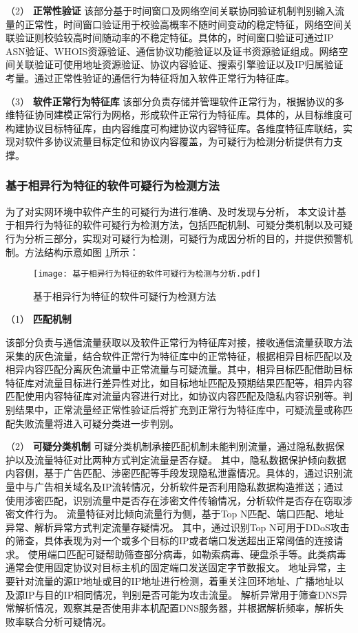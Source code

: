（2） \textbf{正常性验证}\quad
该部分基于时间窗口及网络空间关联协同验证机制判别输入流量的正常性，时间窗口验证用于校验高概率不随时间变动的稳定特征，网络空间关联验证则校验较高时间随动率的不稳定特征。具体的，时间窗口验证可通过IP ASN验证、WHOIS资源验证、通信协议功能验证以及证书资源验证组成。网络空间关联验证可使用地址资源验证、协议内容验证、搜索引擎验证以及IP归属验证考量。通过正常性验证的通信行为特征将加入软件正常行为特征库。

（3） \textbf{软件正常行为特征库}\quad
该部分负责存储并管理软件正常行为，根据协议的多维特征协同建模正常行为网格，形成软件正常行为特征库。具体的，从目标维度可构建协议目标特征库，由内容维度可构建协议内容特征库。各维度特征库联结，实现对软件多协议流量目标定位和协议内容覆盖，为可疑行为检测分析提供有力支撑。 
\FloatBarrier
\subsubsection{基于相异行为特征的软件可疑行为检测方法}
\FloatBarrier

为了对实网环境中软件产生的可疑行为进行准确、及时发现与分析，
本文设计基于相异行为特征的软件可疑行为检测方法，包括匹配机制、可疑分类机制以及可疑行为分析三部分，实现对可疑行为检测，可疑行为成因分析的目的，并提供预警机制。方法结构示意如图 \ref{fig:基于相异行为特征的软件可疑行为检测方法}所示：

 
\begin{figure}[ht]
  \centering
  \texttt{[image: 基于相异行为特征的软件可疑行为检测与分析.pdf]}
  \caption{基于相异行为特征的软件可疑行为检测方法}
  \label{fig:基于相异行为特征的软件可疑行为检测方法}
\end{figure} 


（1） \textbf{匹配机制}\quad

该部分负责与通信流量获取以及软件正常行为特征库对接，接收通信流量获取方法采集的灰色流量，结合软件正常行为特征库中的正常特征，根据相异目标匹配以及相异内容匹配分离灰色流量中正常流量与可疑流量。其中，相异目标匹配借助目标特征库对流量目标进行差异性对比，如目标地址匹配及预期结果匹配等，相异内容匹配使用内容特征库对流量内容进行对比，如协议内容匹配及隐私内容识别等。判别结果中，正常流量经正常性验证后将扩充到正常行为特征库中，可疑流量或称匹配失败流量将进入可疑分类进一步判别。

（2） \textbf{可疑分类机制}\quad
可疑分类机制承接匹配机制未能判别流量，通过隐私数据保护以及流量特征对比两种方式判定流量是否存疑。
其中，隐私数据保护倾向数据内容侧，基于广告匹配、涉密匹配等手段发现隐私泄露情况。具体的，通过识别流量中与广告相关域名及IP流转情况，分析软件是否利用隐私数据构造推送；通过使用涉密匹配，识别流量中是否存在涉密文件传输情况，分析软件是否存在窃取涉密文件行为。
流量特征对比倾向流量行为侧，基于Top N匹配、端口匹配、地址异常、解析异常方式判定流量存疑情况。
其中，通过识别Top N可用于DDoS攻击的筛查，具体表现为对一个或多个目标的IP或者端口发送超出正常阈值的连接请求。
使用端口匹配可疑帮助筛查部分病毒，如勒索病毒、硬盘杀手等。此类病毒通常会使用固定协议对目标主机的固定端口发送固定字节数报文。
地址异常，主要针对流量的源IP地址或目的IP地址进行检测，着重关注回环地址、广播地址以及源IP与目的IP相同情况，判别是否可能为攻击流量。
解析异常用于筛查DNS异常解析情况，观察其是否使用非本机配置DNS服务器，并根据解析频率，解析失败率联合分析可疑情况。
 
